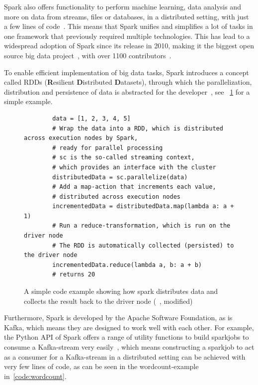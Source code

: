 Spark also offers functionality to perform machine learning, data analysis and more on data from streams,
files or databases, in a distributed setting, with just a few lines of code~\cite{sparkDocs}.
This means that Spark unifies and simplifies a lot of tasks in one framework that previously required multiple technologies.
This has lead to a widespread adoption of Spark since its release in 2010,
making it the biggest open source big data project~\cite{Zaharia2016}, with over 1100 contributors~\cite{sparkContributor}.

To enable efficient implementation of big data tasks, Spark introduces a concept called RDDs
(\textbf{R}esilient \textbf{D}istributed \textbf{D}atasets),
through which the parallelization, distribution and persistence of data is abstracted for the developer~\cite{sparkDocs},
see ~\cref{code:simpleParallelization} for a simple example.

\begin{figure}
    \caption{A simple code example showing how spark distributes data and collects the result back to the driver node (~\cite{sparkDocs}, modified)}
    \label{code:simpleParallelization}
    \begin{verbatim}
        data = [1, 2, 3, 4, 5]
        # Wrap the data into a RDD, which is distributed across execution nodes by Spark,
        # ready for parallel processing
        # sc is the so-called streaming context,
        # which provides an interface with the cluster
        distributedData = sc.parallelize(data)
        # Add a map-action that increments each value,
        # distributed across execution nodes
        incrementedData = distributedData.map(lambda a: a + 1)
        # Run a reduce-transformation, which is run on the driver node
        # The RDD is automatically collected (persisted) to the driver node
        incrementedData.reduce(lambda a, b: a + b)
        # returns 20
    \end{verbatim}
\end{figure}

Furthermore, Spark is developed by the Apache Software Foundation, as is Kafka,
which means they are designed to work well with each other.
For example, the Python API of Spark offers a range of utility functions to build sparkjobs to consume a Kafka-stream very easily~\cite{sparkDocs},
which means constructing a sparkjob to act as a consumer for a Kafka-stream in a distributed setting can be achieved with very few lines of code,
as can be seen in the wordcount-example in~\cref{code:wordcount}.

